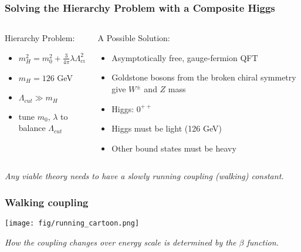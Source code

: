 \begin{frame}
  \frametitle{Solving the Hierarchy Problem with a Composite Higgs}
  \begin{columns}[T]
    \begin{column}{.5\textwidth}
      Hierarchy Problem:
      \begin{itemize}
        \item $m^2_H=m^2_0+\frac{3}{4\pi}\lambda\Lambda_{cut}^2$
        \item $m_H=126$ GeV
        \item $\Lambda_{cut} \gg m_H$
        \item tune $m_0$, $\lambda$ to balance $\Lambda_{cut}$
      \end{itemize}
    \end{column}
    \begin{column}{.5\textwidth}
      A Possible Solution:
      \begin{itemize}
        \item Asymptotically free, gauge-fermion QFT 
        \item Goldstone bosons from the broken chiral symmetry give $W^{\pm}$ and $Z$ mass
        \item Higgs:  $0^{++}$
        \item Higgs must be light (126 GeV)
        \item Other bound states must be heavy
      \end{itemize}
    \end{column}
  \end{columns}
  \vspace{12pt}
  \emph{Any viable theory needs to have a slowly running coupling (walking) constant.}
\end{frame}

\begin{frame}
  \frametitle{Walking coupling}
  \begin{center}
    \texttt{[image: fig/running\_cartoon.png]}
  \end{center}
  \vspace{12pt}
  \emph{How the coupling changes over energy scale is determined by the $\beta$ function.}
\end{frame}


